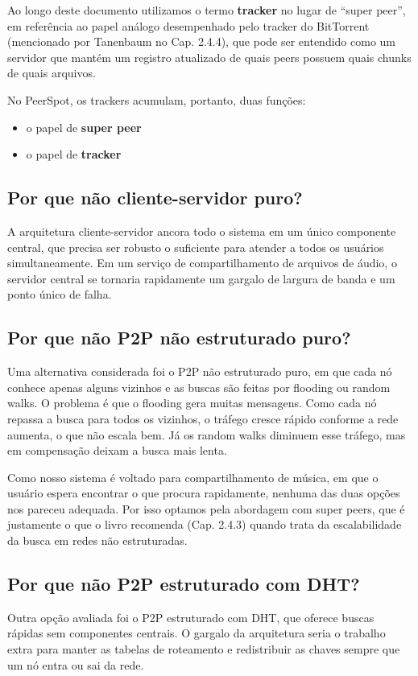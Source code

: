 \documentclass[12pt, a4paper]{article}
\begin{document}
Ao longo deste documento utilizamos o termo \textbf{tracker} no lugar de ``super peer'', em referência ao papel análogo desempenhado pelo tracker do BitTorrent (mencionado por Tanenbaum no Cap. 2.4.4), que pode ser entendido como um servidor que mantém um registro atualizado de quais peers possuem quais chunks de quais arquivos.

No PeerSpot, os trackers acumulam, portanto, duas funções: 
\begin{itemize}
    \item o papel de \textbf{super peer}
    \item o papel de \textbf{tracker}
\end{itemize}


\subsection{Por que não cliente-servidor puro?}

A arquitetura cliente-servidor ancora todo o sistema em um único componente central, que precisa ser robusto o suficiente para atender a todos os usuários simultaneamente. Em um serviço de compartilhamento de arquivos de áudio, o servidor central se tornaria rapidamente um gargalo de largura de banda e um ponto único de falha.

\subsection{Por que não P2P não estruturado puro?}

Uma alternativa considerada foi o P2P não estruturado puro, em que cada nó conhece apenas alguns vizinhos e as buscas são feitas por flooding ou random walks. O problema é que o flooding gera muitas mensagens. Como cada nó repassa a busca para todos os vizinhos, o tráfego cresce rápido conforme a rede aumenta, o que não escala bem. Já os random walks diminuem esse tráfego, mas em compensação deixam a busca mais lenta.

Como nosso sistema é voltado para compartilhamento de música, em que o usuário espera encontrar o que procura rapidamente, nenhuma das duas opções nos pareceu adequada. Por isso optamos pela abordagem com super peers, que é justamente o que o livro recomenda (Cap. 2.4.3) quando trata da escalabilidade da busca em redes não estruturadas.

\subsection{Por que não P2P estruturado com DHT?}\label{sec:dht}
Outra opção avaliada foi o P2P estruturado com DHT, que oferece buscas rápidas sem componentes centrais. O gargalo da arquitetura seria o trabalho extra para manter as tabelas de roteamento e redistribuir as chaves sempre que um nó entra ou sai da rede. 
\end{document}
